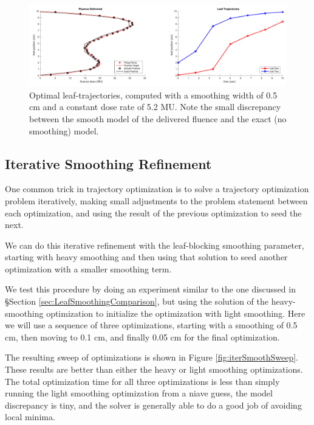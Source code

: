 \documentclass[12pt]{article}
\begin{document}
\begin{figure}
  \centering
  \includegraphics[width=\textwidth]{fig/fluenceMapSmoothingExample.pdf}
  \caption{ Optimal leaf-trajectories, computed with a smoothing width of 0.5 cm and a constant
            dose rate of 5.2 MU. Note the small discrepancy between the smooth model of the
            delivered fluence and the exact (no smoothing) model.}
  \label{fig:fluenceMapSmoothingExample}
\end{figure}


\subsection{Iterative Smoothing Refinement}

One common trick in trajectory optimization is to solve a trajectory optimization problem
iteratively, making small adjustments to the problem statement between each optimization,
and using the result of the previous optimization to seed the next.

We can do this iterative refinement with the leaf-blocking smoothing parameter,
starting with heavy smoothing and then using that solution to seed another optimization
with a smaller smoothing term.

We test this procedure by doing an experiment similar to the one discussed in
\S Section \ref{sec:LeafSmoothingComparison}, but using the solution of the heavy-smoothing
optimization to initialize the optimization with light smoothing.
Here we will use a sequence of three optimizations, starting with a smoothing of
0.5 cm, then moving to 0.1 cm, and finally 0.05 cm for the final optimization.

The resulting sweep of optimizations is shown in Figure \ref{fig:iterSmoothSweep}.
These results are better than either the heavy or light smoothing optimizations.
The total optimization time for all three optimizations is less than simply running the
light smoothing optimization from a niave guess, the model discrepancy is tiny, and the
solver is generally able to do a good job of avoiding local minima.
\end{document}
